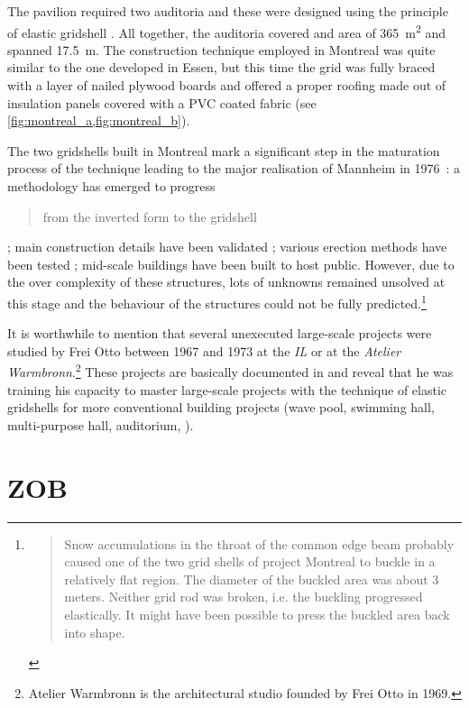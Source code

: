 The pavilion required two auditoria and these were designed using the principle of elastic gridshell \cite[p.~274]{IL10}. All together, the auditoria covered and area of \SI{365}{m^2} and spanned \SI{17.5}{m}. The construction technique employed in Montreal was quite similar to the one developed in Essen, but this time the grid was fully braced with a layer of nailed plywood boards and offered a proper roofing made out of insulation panels covered with a PVC coated fabric (see \cref{fig:montreal_a,fig:montreal_b}).

The two gridshells built in Montreal mark a significant step in the maturation process of the technique leading to the major realisation of Mannheim in 1976~: a methodology has emerged to progress \blockcquote[p.~179]{IL10}{from the inverted form to the gridshell} ; main construction details have been validated ; various erection methods have been tested ; mid-scale buildings have been built to host public. However, due to the over complexity of these structures, lots of unknowns remained unsolved at this stage and the behaviour of the structures could not be fully predicted.\footnote{\blockcquote[p.~219]{IL10}{Snow accumulations in the throat of the common edge beam probably caused one of the two grid shells of project Montreal to buckle in a relatively flat region. The diameter of the buckled area was about 3 meters. Neither grid rod was broken, i.e. the buckling progressed elastically. It might have been possible to press the buckled area back into shape.}}

It is worthwhile to mention that several unexecuted large-scale projects were studied by Frei Otto between 1967 and 1973 at the \emph{IL} or at the \emph{Atelier Warmbronn}.\footnote{Atelier Warmbronn is the architectural studio founded by Frei Otto in 1969.} These projects are basically documented in \cite[pp.~278 - 288]{IL10} and reveal that he was training his capacity to master large-scale projects with the technique of elastic gridshells for more conventional building projects (wave pool, swimming hall, multi-purpose hall, auditorium, \telp{}).

\section{ZOB}
\kant[1-10]



